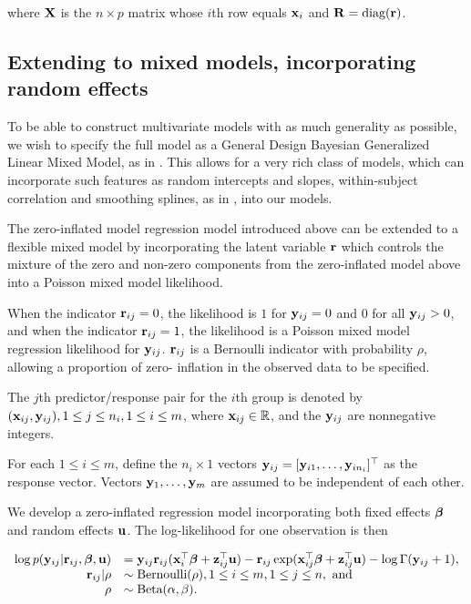 \noindent where ${\bf X}$ is the $n\times p$ matrix whose $i$th row equals ${\bf x}_i$ and ${\bf R} = \text{diag}{({\bf r})}$.

\subsection{Extending to mixed models, incorporating random effects}

To be able to construct multivariate models with as much generality as possible, we wish to specify the full
model as a General Design Bayesian Generalized Linear Mixed Model, as in \cite{Zhao2006}. This allows for a
very rich class of models, which can incorporate such features as random intercepts and slopes, within-subject
correlation and smoothing splines, as in \cite{Wand2008}, into our models.

The zero-inflated model regression model introduced above can be extended to a flexible mixed model by
incorporating the latent variable ${\bf r}$ which controls the mixture of the zero and non-zero components from
the zero-inflated model above into a Poisson mixed model likelihood.

When the indicator ${\bf r}_{ij} = 0$, the likelihood is $1$ for ${\bf y}_{ij} = 0$ and $0$ for all ${\bf y}_{ij} > 0$,
and when the indicator ${\bf r}_{ij} = 1$, the likelihood is a Poisson mixed model regression likelihood for
${\bf y}_{ij}$. ${\bf r}_{ij}$ is a Bernoulli indicator with probability $\rho$, allowing a proportion of zero-
inflation in the observed data to be specified.

The $j$th predictor/response pair for the $i$th group is denoted by $({\bf x}_{ij}, {\bf y}_{ij}), 1 \leq j \leq n_i, 1 \leq i \leq m$, where ${\bf x}_{ij} \in {\mathbb{R}}$, and the ${\bf y}_{ij}$ are nonnegative integers.

For each $1 \leq i \leq m$, define the $n_i \times 1$ vectors ${\bf y}_{ij} = [{\bf y}_{i 1}, \ldots, {\bf y}_{i
n_i}]^\top$ as the response vector. Vectors ${\bf y}_1, \ldots, {\bf y}_m$ are assumed to be independent of each other.

We develop a zero-inflated regression model incorporating both fixed effects ${\boldsymbol \beta}$ and random effects
${\bf u}$. The log-likelihood for one observation is then

$$
	\begin{array}{rl}
		\log p({\bf y}_{ij} | {\bf r}_{ij}, {\boldsymbol \beta}, {\bf u}) & = {\bf y}_{ij} {\bf r}_{ij} ({\bf x}_i^\top {\boldsymbol\beta} + {\bf z}_{ij}^\top {\bf u}) - {\bf r}_{ij} \exp ({\bf x}_{ij}^\top {\boldsymbol\beta} + {\bf z}_{ij}^\top {\bf u}) - \log \Gamma ({\bf y}_{ij} + 1), \\
		{\bf r}_{ij} | \rho                  & \sim \text{Bernoulli}(\rho), 1 \leq i \leq m, 1 \leq j \leq n, \text{ and }                                                              \\
		\rho                        & \sim \text{Beta}(\alpha, \beta).                                                                                              \\
	\end{array}
$$

